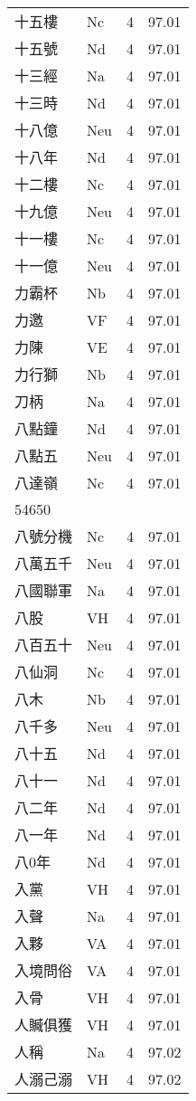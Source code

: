 \documentclass[twocolumn]{book}
\begin{document}
\begin{supertabular}{llrr}
十五樓 & Nc & 4 &  97.01\\
十五號 & Nd & 4 &  97.01\\
十三經 & Na & 4 &  97.01\\
十三時 & Nd & 4 &  97.01\\
十八億 & Neu & 4 &  97.01\\
十八年 & Nd & 4 &  97.01\\
十二樓 & Nc & 4 &  97.01\\
十九億 & Neu & 4 &  97.01\\
十一樓 & Nc & 4 &  97.01\\
十一億 & Neu & 4 &  97.01\\
力霸杯 & Nb & 4 &  97.01\\
力邀 & VF & 4 &  97.01\\
力陳 & VE & 4 &  97.01\\
力行獅 & Nb & 4 &  97.01\\
刀柄 & Na & 4 &  97.01\\
八點鐘 & Nd & 4 &  97.01\\
八點五 & Neu & 4 &  97.01\\
八達嶺 & Nc & 4 &  97.01\\
54650\\
八號分機 & Nc & 4 &  97.01\\
八萬五千 & Neu & 4 &  97.01\\
八國聯軍 & Na & 4 &  97.01\\
八股 & VH & 4 &  97.01\\
八百五十 & Neu & 4 &  97.01\\
八仙洞 & Nc & 4 &  97.01\\
八木 & Nb & 4 &  97.01\\
八千多 & Neu & 4 &  97.01\\
八十五 & Nd & 4 &  97.01\\
八十一 & Nd & 4 &  97.01\\
八二年 & Nd & 4 &  97.01\\
八一年 & Nd & 4 &  97.01\\
八0年 & Nd & 4 &  97.01\\
入黨 & VH & 4 &  97.01\\
入聲 & Na & 4 &  97.01\\
入夥 & VA & 4 &  97.01\\
入境問俗 & VA & 4 &  97.01\\
入骨 & VH & 4 &  97.01\\
人贓俱獲 & VH & 4 &  97.01\\
人稱 & Na & 4 &  97.02\\
人溺己溺 & VH & 4 &  97.02\\

\end{supertabular}
\end{document}

